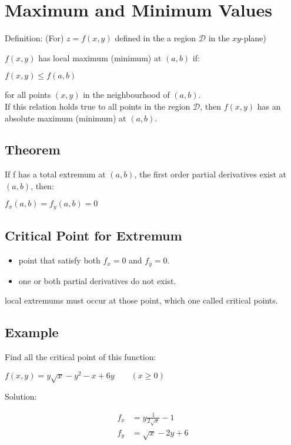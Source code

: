 \section{Maximum and Minimum Values}
Definition: (For) $z=f(x,y)$ defined in the a region $\mathcal{D}$ in the $xy$-plane)

$f(x,y)$ has local maximum (minimum) at $(a,b)$ if:

\begin{center}
$f(x,y)\leq f(a,b)$
\end{center}

for all points $(x,y)$ in the neighbourhood of $(a,b)$.\\

If this relation holds true to all points in the region $\mathcal{D}$, then $f(x,y)$ has an absolute maximum (minimum) at $(a,b)$.

\subsection{Theorem}
If f has a total extremum at $(a,b)$, the first order partial derivatives exist at $(a,b)$, then:

\begin{center}
$f_x(a,b)=f_y(a,b)=0$
\end{center}

\subsection{Critical Point for Extremum}
\begin{itemize}
\item point that satisfy both $f_x=0$ and $f_y=0$.
\item one or both partial derivatives do not exist.
\end{itemize}

local extremums must occur at those point, which one called critical points.

\subsection{Example}
Find all the critical point of this function:
\begin{center}
$f(x,y)=y\sqrt{x}-y^2-x+6y\qquad (x\geq 0)$
\end{center}

Solution:

\begin{align*}
f_x &=y\frac{1}{2\sqrt{x}}-1\\
f_y &=\sqrt{x}-2y+6
\end{align*}

